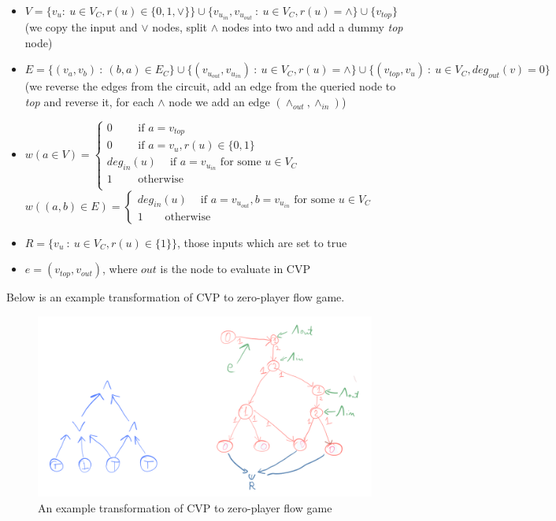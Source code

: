\begin{itemize}
      \item $V = \{v_u :\ u \in V_C, r(u) \in \{0, 1, \lor\}\} \cup
                 \{v_{u_{in}}, v_{u_{out}}\ :\ u \in V_C, r(u) = \land \} \cup \{v_{top}\}$
                 (we copy the input and $\lor$ nodes, split $\land$ nodes into two and add a dummy \textit{top} node)
      \item $E = \{ (v_{a}, v_{b})\ :\ (b, a) \in E_C \} \cup
                  \{(v_{u_{out}}, v_{u_{in}})\ :\ u \in V_C, r(u) = \land \} \cup
                  \{ (v_{top}, v_{u})\ :\ u \in V_C, deg_{out}(v) = 0 \}$
                  (we reverse the edges from the circuit, add an edge from the queried node to \textit{top} and
                  reverse it, for each $\land$ node we add an edge $(\land_{out}, \land_{in})$)
      \item $w(a \in V) = \begin{cases}
                  0\ \ \ \ \ \ \ \ \ \text{ if } a = v_{top}\\
                  0\ \ \ \ \ \ \ \ \ \text{ if } a = v_{u}, r(u) \in \{0,1\}\\
                  deg_{in}(u)\ \ \ \ \text{ if } a = v_{u_{in}} \text{ for some } u \in V_C\\
                  1\ \ \ \ \ \ \ \ \ \text{ otherwise }\\
            \end{cases}$\\
            $w((a,b) \in E) = \begin{cases}
                  deg_{in}(u)\ \ \ \ \text{ if } a = v_{u_{out}}, b = v_{u_{in}} \text{ for some } u \in V_C\\
                  1\ \ \ \ \ \ \ \ \ \text{otherwise}
            \end{cases}$            
      \item $R = \{ v_u\ :\ u \in V_C, r(u) \in \{1\} \}$, those inputs which are set to true
      \item $e = (v_{top}, v_{out})$, where $out$ is the node to evaluate in CVP
\end{itemize}
Below is an example transformation of CVP to zero-player flow game.
\begin{figure}[H]
      \centering
      \caption{An example transformation of CVP to zero-player flow game}
      \includegraphics[scale=0.2]{content/graphics/game15.png}
\end{figure}
